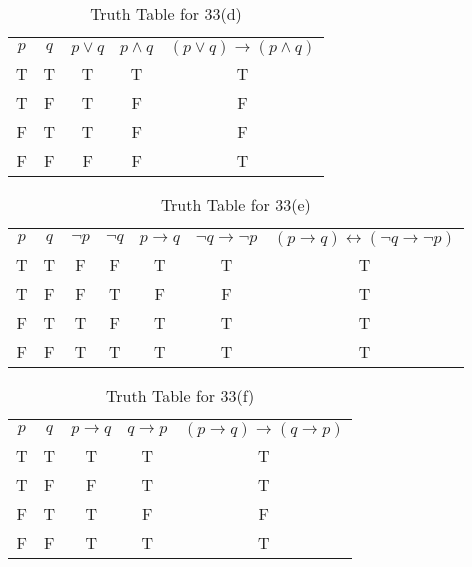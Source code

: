 \documentclass{Axon}
\begin{document}
\begin{table}[ht]
    \centering
    \begin{tabular}{c|c|c|c|c}
        \(p\) & \(q\) & \(p \lor q\) & \(p \land q\) & \((p \lor q) \to (p \land q)\) \\
        T     & T     & T            & T             & T                              \\
        T     & F     & T            & F             & F                              \\
        F     & T     & T            & F             & F                              \\
        F     & F     & F            & F             & T
    \end{tabular}
    \caption{Truth Table for 33(d)}
\end{table}

\begin{table}[ht]
    \centering
    \begin{tabular}{c|c|c|c|c|c|c}
        \(p\) & \(q\) & \(\lnot p\) & \(\lnot q\) & \(p \to q\) & \(\lnot q \to \lnot p\) & \((p \to q) \leftrightarrow (\lnot q \to \lnot p)\) \\
        T     & T     & F           & F           & T           & T                       & T                                                   \\
        T     & F     & F           & T           & F           & F                       & T                                                   \\
        F     & T     & T           & F           & T           & T                       & T                                                   \\
        F     & F     & T           & T           & T           & T                       & T
    \end{tabular}
    \caption{Truth Table for 33(e)}
\end{table}

\begin{table}[ht]
    \centering
    \begin{tabular}{c|c|c|c|c}
        \(p\) & \(q\) & \(p \to q\) & \(q \to p\) & \((p \to q) \to (q \to p)\) \\
        T     & T     & T           & T           & T                           \\
        T     & F     & F           & T           & T                           \\
        F     & T     & T           & F           & F                           \\
        F     & F     & T           & T           & T
    \end{tabular}
    \caption{Truth Table for 33(f)}
\end{table}
\end{document}
